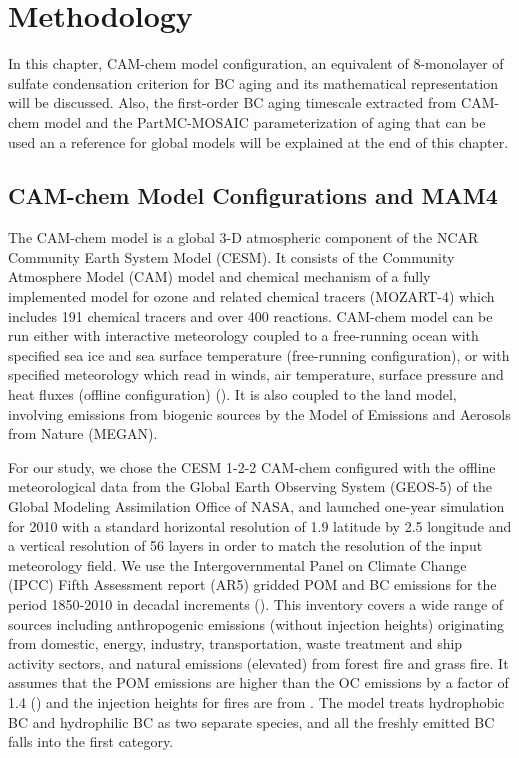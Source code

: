 \documentclass[12pt, fullpage]{uiucthesis2009}
\begin{document}
	\chapter{Methodology}
	In this chapter, CAM-chem model configuration, an equivalent of 8-monolayer of sulfate condensation criterion for BC aging and its mathematical representation will be discussed. Also, the first-order BC aging timescale extracted from CAM-chem model and the PartMC-MOSAIC parameterization of aging that can be used an a reference for global models will be explained at the end of this chapter.
	
	\section{CAM-chem Model Configurations and MAM4}
	
	The CAM-chem model is a global 3-D atmospheric component of the NCAR Community Earth System Model (CESM). It consists of the Community Atmosphere Model (CAM) model and chemical mechanism of a fully implemented model for ozone and related chemical tracers (MOZART-4) which includes 191 chemical tracers and over 400 reactions. CAM-chem model can be run either with interactive meteorology coupled to a free-running ocean with specified sea ice and sea surface temperature (free-running configuration), or with specified meteorology which read in winds, air temperature, surface pressure and heat fluxes (offline configuration) (\cite{Lamarque2012}). It is also coupled to the land model, involving emissions from biogenic sources by the Model of Emissions and Aerosols from Nature (MEGAN). 
	
	For our study, we chose the CESM 1-2-2 CAM-chem configured with the offline meteorological data from the Global Earth Observing System (GEOS-5) of the Global Modeling Assimilation Office of NASA, and launched one-year simulation for 2010 with a standard horizontal resolution of 1.9  latitude by 2.5 longitude and a vertical resolution of 56 layers in order to match the resolution of the input meteorology field. We use the Intergovernmental Panel on Climate Change (IPCC) Fifth Assessment report (AR5) gridded POM and BC emissions for the period 1850-2010 in decadal increments (\cite{Lamarque2010}). This inventory covers a wide range of sources including anthropogenic emissions (without injection heights) originating from domestic, energy, industry, transportation, waste treatment and ship activity sectors, and natural emissions (elevated) from forest fire and grass fire. It assumes that the POM emissions are higher than the OC emissions by a factor of 1.4 (\cite{Liu2012}) and the injection heights for fires are from \cite{dentener2006emissions}. The model treats hydrophobic BC and hydrophilic BC as two separate species, and all the freshly emitted BC falls into the first category. 
	
\end{document}
